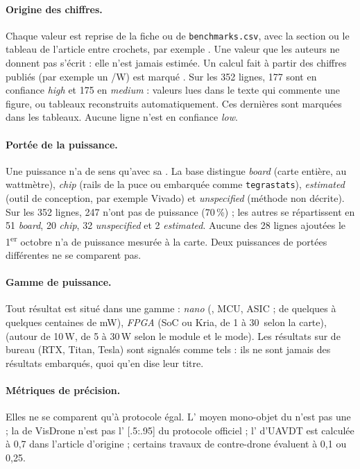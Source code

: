 \paragraph{Origine des chiffres.} Chaque valeur est reprise de la fiche ou de
\texttt{benchmarks.csv}, avec la section ou le tableau de l'article entre crochets, par
exemple . Une valeur que les auteurs ne donnent pas s'écrit \nr{} : elle
n'est jamais estimée. Un calcul fait à partir des chiffres publiés (par exemple un /W)
est marqué \deduit. Sur les 352 lignes, 177 sont en confiance \emph{high} et 175 en
\emph{medium} : valeurs lues dans le texte qui commente une figure, ou tableaux
reconstruits automatiquement. Ces dernières sont marquées \med{} dans les tableaux. Aucune
ligne n'est en confiance \emph{low}.

\paragraph{Portée de la puissance.} Une puissance n'a de sens qu'avec sa . La base
distingue \emph{board} (carte entière, au wattmètre), \emph{chip} (rails de la puce ou
 embarquée comme \texttt{tegrastats}), \emph{estimated} (outil de conception,
par exemple Vivado) et \emph{unspecified} (méthode non décrite). Sur les 352 lignes,
247 n'ont pas de puissance (70\,\%) ; les autres se répartissent en 51 \emph{board},
20 \emph{chip}, 32 \emph{unspecified} et 2 \emph{estimated}. Aucune des 28 lignes
ajoutées le 1\textsuperscript{er} octobre n'a de puissance mesurée à la carte. Deux puissances de portées
différentes ne se comparent pas.

\paragraph{Gamme de puissance.} Tout résultat est situé dans une gamme : \emph{nano}
(, MCU, ASIC ; de quelques  à quelques centaines de mW), \emph{FPGA} (SoC  ou
Kria, de 1 à 30\, selon la carte), \emph{} (autour de 10\,W, de 5 à 30\,W selon le
module et le mode). Les résultats sur  de bureau (RTX, Titan, Tesla) sont signalés
comme tels : ils ne sont jamais des résultats embarqués, quoi qu'en dise leur titre.

\paragraph{Métriques de précision.} Elles ne se comparent qu'à protocole égal. L' moyen
mono-objet du  n'est pas une  ; la  de VisDrone n'est pas l' 
[.5:.95] du protocole officiel ; l' d'UAVDT est calculée à  0,7 dans l'article
d'origine ; certains travaux de contre-drone évaluent à  0,1 ou 0,25.

